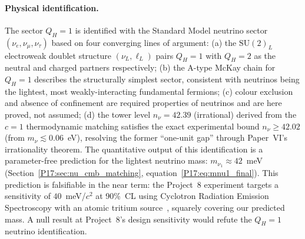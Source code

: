 \documentclass[11pt,a4paper]{article}
\theoremstyle{definition}\newtheorem{definition}[theorem]{Definition}
\theoremstyle{remark}
\newcommand{\SU}{\mathrm{SU}}
\newcommand{\QH}{Q_H}
\begin{document}
\paragraph{Physical identification.}
The sector $\QH=1$ is identified with the Standard Model neutrino
sector $(\nu_e,\nu_\mu,\nu_\tau)$ based on four converging lines of
argument: (a) the $\SU(2)_L$ electroweak doublet structure
$(\nu_L,\ell_L)$ pairs $\QH=1$ with $\QH=2$ as the neutral and charged
partners respectively; (b) the A-type McKay chain for $\QH=1$
describes the structurally simplest sector, consistent with neutrinos
being the lightest, most weakly-interacting fundamental fermions; (c)
colour exclusion and absence of confinement are required properties of
neutrinos and are here proved, not assumed; (d) the tower level
$n_\nu=42.39$ (irrational) derived from the $c=1$ thermodynamic
matching satisfies the exact experimental bound $n_\nu\geq42.02$
(from $m_\nu\lesssim0.06$~eV), resolving the former ``one-unit gap''
through Paper~VI's irrationality theorem.
The quantitative output of this identification is a parameter-free
prediction for the lightest neutrino mass:
$m_{\nu_1}\approx42$~meV (Section~\ref{P17:sec:nu_cmb_matching},
equation~\eqref{P17:eq:mnu1_final}).  This prediction is falsifiable
in the near term: the Project~8 experiment targets a sensitivity of
$40$~meV/$c^2$ at 90\%~CL using Cyclotron Radiation Emission
Spectroscopy with an atomic tritium source~\cite{Asner2015}, squarely
covering our predicted mass.  A null result at Project~8's design
sensitivity would refute the $\QH=1$ neutrino identification.
\end{document}
